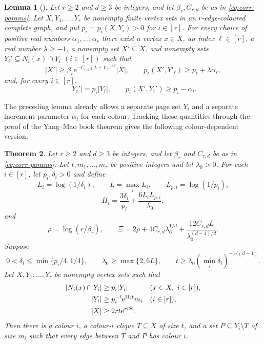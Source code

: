 \documentclass[11pt]{article}
\newtheorem{theorem}{Theorem}[section]
\newtheorem{lemma}[theorem]{Lemma}
\theoremstyle{definition}
\newcommand{\e}{\mathrm e}
\begin{document}
\begin{lemma}[{\cite[Theorem~3.4 and Lemma~4.1]{YangMao}}]\label{lem:increment}
Let $r\ge2$ and $d\ge3$ be integers, and let $\beta_r,C_{r,d}$ be as in
\eqref{eq:corr-params}.  Let $X,Y_1,\ldots,Y_r$ be nonempty finite vertex
sets in an $r$-edge-coloured complete graph, and put
$p_i=p_i(X,Y_i)>0$ for $i\in[r]$.  For every choice of positive real numbers
$\alpha_1,\ldots,\alpha_r$ there exist a vertex $x\in X$, an index
$\ell\in[r]$, a real number $\lambda\ge-1$, a nonempty set $X'\subseteq X$,
and nonempty sets $Y_i'\subseteq N_i(x)\cap Y_i$ $(i\in[r])$ such that
\[
 |X'|\ge\beta_r\e^{-C_{r,d}(\lambda+1)^{1/d}}|X|,
 \qquad
 p_\ell(X',Y'_\ell)\ge p_\ell+\lambda\alpha_\ell,
\]
and, for every $i\in[r]$,
\[
 |Y_i'|=p_i|Y_i|,
 \qquad
 p_i(X',Y_i')\ge p_i-\alpha_i.
\]
\end{lemma}

The preceding lemma already allows a separate page set $Y_i$ and a separate
increment parameter $\alpha_i$ for each colour.  Tracking these quantities
through the proof of the Yang--Mao book theorem gives the following
colour-dependent version.

\begin{theorem}\label{thm:book}
Let $r\ge2$ and $d\ge3$ be integers, and let $\beta_r$ and $C_{r,d}$ be as in
\eqref{eq:corr-params}.  Let $t,m_1,\ldots,m_r$ be positive integers and let
$\lambda_0>0$.  For each
$i\in[r]$, let $p_i,\delta_i>0$ and define
\[
 L_i=\log(1/\delta_i),\qquad L=\max_iL_i,
 \qquad L_{p,i}=\log(1/p_i),
\]
\[
 \Pi_i=\frac{3\delta_i}{p_i}
       +\frac{6L_iL_{p,i}}{\lambda_0},
\]
and
\[
 \rho=\log(r/\beta_r),\qquad
 \Xi=2\rho+4C_{r,d}\lambda_0^{1/d}
      +\frac{12C_{r,d}L}{\lambda_0^{(d-1)/d}}.
\]
Suppose
\begin{equation}\label{eq:book-parameters}
 0<\delta_i\le\min\{p_i/4,1/4\},
 \qquad
 \lambda_0\ge\max\{2,6L\},
 \qquad
 t\ge\lambda_0(\min_i\delta_i)^{-1/(d-1)}.
\end{equation}
Let $X,Y_1,\ldots,Y_r$ be nonempty vertex sets such that
\begin{align}
 |N_i(x)\cap Y_i|&\ge p_i|Y_i|
 &&(x\in X,\ i\in[r]),\notag\\
 |Y_i|&\ge p_i^{-t}\e^{\Pi_it}m_i
 &&(i\in[r]),\notag\\
 |X|&\ge2rt\e^{rt\Xi}.\label{eq:book-reservoir}
\end{align}
Then there is a colour $i$, a colour-$i$ clique $T\subseteq X$ of size $t$,
and a set $P\subseteq Y_i\setminus T$ of size $m_i$ such that every edge
between $T$ and $P$ has colour $i$.
\end{theorem}
\end{document}
